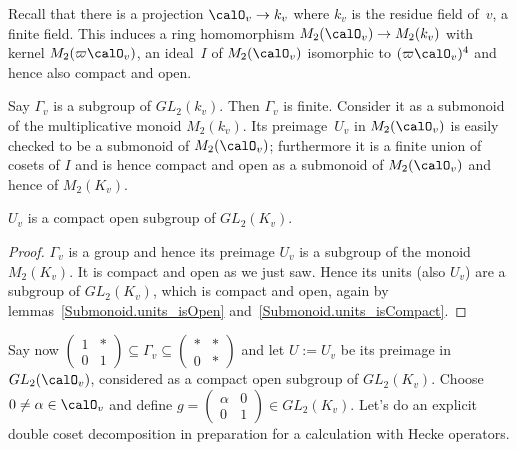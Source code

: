 Recall that there is a projection $\calO_v\to k_v$ where $k_v$ is the residue
field of~$v$, a finite field. This induces a ring homomorphism $M_2(\calO_v)\to M_2(k_v)$
with kernel $M_2(\varpi\calO_v)$, an ideal~$I$ of $M_2(\calO_v)$ isomorphic to $(\varpi\calO_v)^4$
and hence also compact and open.

Say $\Gamma_v$ is a subgroup of $GL_2(k_v)$. Then $\Gamma_v$ is finite. Consider it as a submonoid of
the multiplicative monoid $M_2(k_v)$. Its preimage~$U_v$ in $M_2(\calO_v)$
is easily checked to be a submonoid of $M_2(\calO_v)$; furthermore it is a finite union of
cosets of $I$ and is hence compact and open as a submonoid of $M_2(\calO_v)$ and hence of $M_2(K_v)$.

\begin{lemma}
  \label{nolean-compactopen-U1p} $U_v$ is a compact open subgroup of $GL_2(K_v)$.
\end{lemma}
\begin{proof}
  $\Gamma_v$ is a group and hence its preimage $U_v$ is a subgroup of the monoid
  $M_2(K_v)$. It is compact and open as we just saw. Hence its units (also $U_v$)
  are a subgroup of $GL_2(K_v)$, which is compact and open, again by
  lemmas~\ref{Submonoid.units_isOpen} and~\ref{Submonoid.units_isCompact}.
\end{proof}

Say now $\begin{pmatrix}1&*\\0&1\end{pmatrix}\subseteq\Gamma_v\subseteq\begin{pmatrix}*&*\\0&*\end{pmatrix}$
and let $U:=U_v$ be its preimage in $GL_2(\calO_v)$, considered as a compact open subgroup of $GL_2(K_v)$.
Choose $0\not=\alpha\in\calO_v$ and define $g=\begin{pmatrix}\alpha&0\\0&1\end{pmatrix}\in GL_2(K_v)$.
Let's do an explicit double coset decomposition in preparation for a calculation with Hecke operators.

